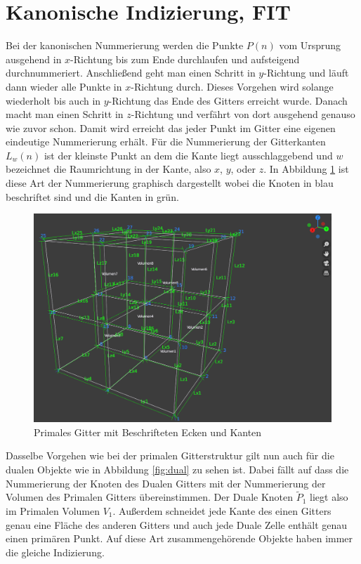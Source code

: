 \section{Kanonische Indizierung, FIT}

Bei der kanonischen Nummerierung werden die Punkte $P(n)$ vom Ursprung ausgehend in $x$-Richtung bis zum Ende durchlaufen und aufsteigend durchnummeriert. Anschließend geht man einen Schritt in $y$-Richtung und läuft dann wieder alle Punkte in $x$-Richtung durch. Dieses Vorgehen wird solange wiederholt bis auch in $y$-Richtung das Ende des Gitters erreicht wurde. Danach macht man einen Schritt in $z$-Richtung und verfährt von dort ausgehend genauso wie zuvor schon. Damit wird erreicht das jeder Punkt im Gitter eine eigenen eindeutige Nummerierung erhält. Für die Nummerierung der Gitterkanten $L_w(n)$ ist der kleinste Punkt an dem die Kante liegt ausschlaggebend und $w$ bezeichnet die Raumrichtung in der Kante, also $x$, $y$, oder $z$.
In Abbildung \ref{fig:primal} ist diese Art der Nummerierung graphisch dargestellt wobei die Knoten in blau beschriftet sind und die Kanten in grün.
\begin{figure}[h]
	\centering
	\includegraphics[width=\textwidth]{data/PrimalAllVertexAllEdge}
	\caption{Primales Gitter mit Beschrifteten Ecken und Kanten}
	\label{fig:primal}
\end{figure}

Dasselbe Vorgehen wie bei der primalen Gitterstruktur gilt nun auch für die dualen Objekte wie in Abbildung \ref{fig:dual} zu sehen ist. Dabei fällt auf dass die Nummerierung der Knoten des Dualen Gitters mit der Nummerierung der Volumen des Primalen Gitters übereinstimmen. Der Duale Knoten $\tilde{P}_1$ liegt also im Primalen Volumen $V_1$. Außerdem schneidet jede Kante des einen Gitters genau eine Fläche des anderen Gitters und auch jede Duale Zelle enthält genau einen primären Punkt. Auf diese Art zusammengehörende Objekte haben immer die gleiche Indizierung.
 

